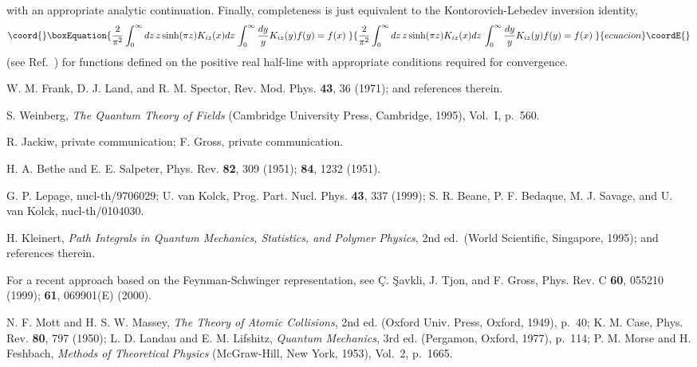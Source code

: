 \documentclass[a4paper,preprint,draft,showpacs,amsmath,amsfonts,amssymb,aps,prd]{revtex4}%
\begin{document}
with an appropriate analytic continuation. 
Finally,
completeness is just equivalent to the Kontorovich-Lebedev inversion 
identity, 
\begin{equation}\coord{}\boxEquation{
\frac{2}{ \pi^{2}}
\int_{0}^{\infty} 
dz
\,
 z \sinh ( \pi z )  K_{iz} (x) dz
\,
\int_{0}^{\infty} \frac{dy}{  y }  
  K_{iz} (y)
f(y)
=
f  ( x)
\;
}{
\frac{2}{ \pi^{2}}
\int_{0}^{\infty} 
dz
\,
 z \sinh ( \pi z )  K_{iz} (x) dz
\,
\int_{0}^{\infty} \frac{dy}{  y }  
  K_{iz} (y)
f(y)
=
f  ( x)
\;
}{ecuacion}\coordE{}\end{equation}
(see Ref.~\cite{kontorovich})
for functions \coordHE{} defined on the positive real half-line with appropriate 
conditions required for convergence.



\begin{thebibliography}{99}

W. M. Frank, D. J. Land, and R. M. Spector,
Rev. Mod. Phys. {\bf 43}, 36 (1971); and references therein.

S. Weinberg,
 {\em The Quantum Theory of Fields\/}
(Cambridge University Press, Cambridge, 1995), Vol.\ I, p.\ 560. 

R. Jackiw, private communication;
F. Gross, private communication.

H. A. Bethe and E. E. Salpeter,
Phys. Rev. {\bf 82},  309 (1951);
{\bf 84},  1232 (1951).

G. P. Lepage, nucl-th/9706029;
U. van Kolck, Prog. Part. Nucl. Phys. {\bf 43}, 337 (1999);
S. R. Beane, P. F. Bedaque, M. J. Savage, and U. van Kolck,
nucl-th/0104030.

H. Kleinert, {\em Path Integrals in Quantum Mechanics, Statistics,
and Polymer Physics\/}, 2nd ed.\  
(World Scientific, Singapore, 1995);
and references therein.

For a recent approach based
on the Feynman-Schwinger representation, see
\c{C}. \c{S}avkli, J. Tjon, and F. Gross,
Phys. Rev. C {\bf 60}, 055210 (1999); {\bf 61}, 069901(E) (2000).

N. F. Mott and H. S. W. Massey,
{\em The Theory of Atomic Collisions\/},
2nd ed. (Oxford Univ. Press, Oxford, 1949),
p.\ 40;
K. M. Case,
Phys. Rev. {\bf 80}, 797 (1950);
L. D. Landau and E. M. Lifshitz,
{\em Quantum Mechanics\/}, 3rd ed.
(Pergamon, Oxford, 1977),
p.\ 114;
P. M. Morse and H. Feshbach,
{\em Methods of Theoretical Physics\/}
(McGraw-Hill, New York, 1953),
 Vol.\ 2, p.\ 1665.


\end{thebibliography}
\end{document}
